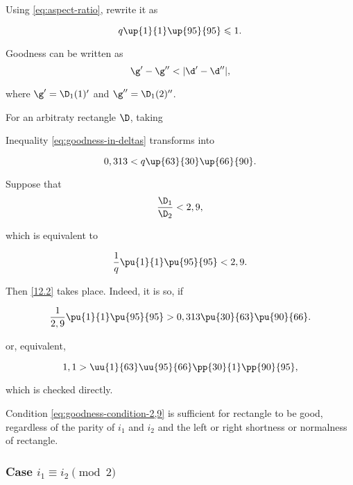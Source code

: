 Using \ref{eq:aspect-ratio}, rewrite it as

\begin{equation*}
	q \up{1}{1} \up{95}{95} \leqslant 1.
\end{equation*}

Goodness can be written as
\begin{equation}\label{eq:goodness-in-deltas}
	\g' - \g'' < |\d' - \d''|,
\end{equation}

where $\g' = \D_1(1)'$ and $\g'' = \D_1(2)''$.

For an arbitraty rectangle $\D$, taking

Inequality \ref{eq:goodness-in-deltas} transforms into

\begin{equation}\label{12.2}
	0,313 < q \up{63}{30} \up{66}{90}.
\end{equation}

Suppose that
%
\begin{equation}\label{eq:goodness-condition-2,9}
	\dfrac{\D_1}{\D_2} < 2,9,
\end{equation}

which is equivalent to

\begin{equation}
	\dfrac{1}{q} \pu{1}{1} \pu{95}{95} < 2,9.
\end{equation}

Then \ref{12.2} takes place. Indeed, it is so, if

\begin{equation*}
	\dfrac{1}{2,9} \pu{1}{1} \pu{95}{95} > 0,313 \pu{30}{63} \pu{90}{66}.
\end{equation*}

or, equivalent,

\begin{equation*}
	1,1 > \uu{1}{63} \uu{95}{66} \pp{30}{1} \pp{90}{95},
\end{equation*}

which is checked directly.

Condition \ref{eq:goodness-condition-2,9} is sufficient for rectangle to be good,
regardless of the parity of $i_1$ and $i_2$ and the left or right shortness or normalness of rectangle.

\subsubsection{Case $i_1 \equiv i_2 \pmod 2$}

